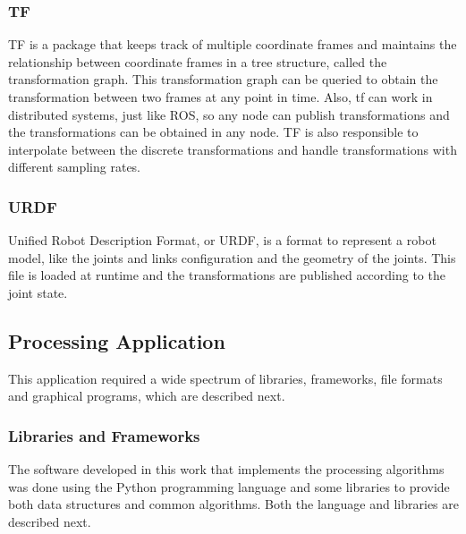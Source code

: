 \subsubsection{TF}

TF is a package that keeps track of multiple coordinate frames and maintains the relationship between coordinate frames in a tree structure, called the transformation graph. This transformation graph can be queried to obtain the transformation between two frames at any point in time. Also, tf can work in distributed systems, just like ROS, so any node can publish transformations and the transformations can be obtained in any node. TF is also responsible to interpolate between the discrete transformations and handle transformations with different sampling rates.

\subsubsection{URDF}

Unified Robot Description Format, or URDF, is a format to represent a robot model, like the joints and links configuration and the geometry of the joints. This file is loaded at runtime and the transformations are published according to the joint state. 


\subsection{Processing Application}
\label{section:processing-application}

This application required a wide spectrum of libraries, frameworks, file formats and graphical programs, which are described next.

\subsubsection{Libraries and Frameworks}

The software developed in this work that implements the processing algorithms was done using the Python programming language and some libraries to provide both data structures and common algorithms. Both the language and libraries are described next.

